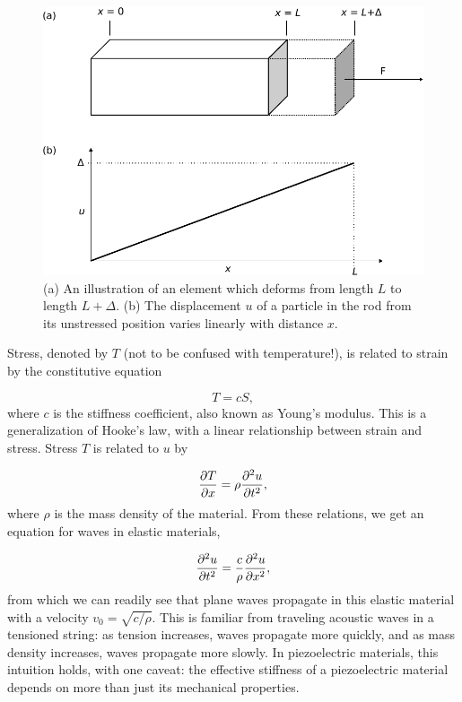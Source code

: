 \documentclass[double,12pt,1in,seploa]{beavtex}
\begin{document}
\begin{figure}
    \includegraphics{displacement field.pdf}
    \caption{(a) An illustration of an element which deforms from length $L$ to length $L + \Delta$. (b) The displacement $u$ of a particle in the rod from its unstressed position varies linearly with distance $x$.} \label{dfield}
\end{figure}
Stress, denoted by $T$ (not to be confused with temperature!), is related to strain by the constitutive equation

\begin{equation}
    T = cS, \label{elastic Hooke's}
\end{equation}
where $c$ is the stiffness coefficient, also known as Young's modulus. This is a generalization of Hooke's law, with a linear relationship between strain and stress. Stress $T$ is related to $u$ by 

\begin{equation}
    \pdv{T}{x} = \rho \pdv[2]{u}{t}, \label{stress related to displacement}
\end{equation}
where $\rho$ is the mass density of the material. From these relations, we get an equation for waves in elastic materials,

\begin{equation}
    \pdv[2]{u}{t} = \frac{c}{\rho} \pdv[2]{u}{x},
\end{equation}
from which we can readily see that plane waves propagate in this elastic material with a velocity $v_0 = \sqrt{c/\rho}$. This is familiar from traveling acoustic waves in a tensioned string: as tension increases, waves propagate more quickly, and as mass density increases, waves propagate more slowly. In piezoelectric materials, this intuition holds, with one caveat: the effective stiffness of a piezoelectric material depends on more than just its mechanical properties.
\end{document}
